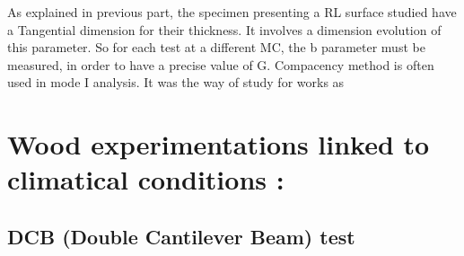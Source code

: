 As explained in previous part, the specimen presenting a RL surface studied have a Tangential dimension for their thickness. It involves a dimension evolution of this parameter. So for each test at a different MC, the b parameter must be measured, in order to have a precise value of G. Compacency method is often used in mode I analysis. It was the way of study for works as \parencite{}


\section{Wood experimentations linked to climatical conditions :}


\subsection{DCB (Double Cantilever Beam) test}

